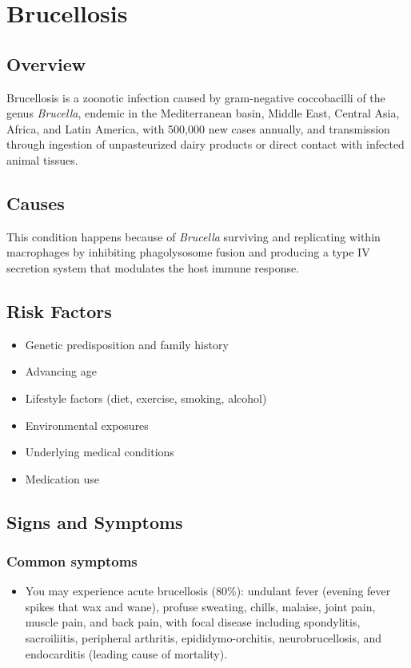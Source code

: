 \chapter{Brucellosis}
\label{sec:Brucellosis}

\section{Overview}
Brucellosis is a zoonotic infection caused by gram-negative coccobacilli of the genus \textit{Brucella}, endemic in the Mediterranean basin, Middle East, Central Asia, Africa, and Latin America, with 500,000 new cases annually, and transmission through ingestion of unpasteurized dairy products or direct contact with infected animal tissues.
\section{Causes}
This condition happens because of \textit{Brucella} surviving and replicating within macrophages by inhibiting phagolysosome fusion and producing a type IV secretion system that modulates the host immune response.     
\section{Risk Factors}

\begin{itemize}[noitemsep]
  \item Genetic predisposition and family history
  \item Advancing age
  \item Lifestyle factors (diet, exercise, smoking, alcohol)
  \item Environmental exposures
  \item Underlying medical conditions
  \item Medication use
\end{itemize}
\section{Signs and Symptoms}

\subsection{Common symptoms}
\begin{itemize}[noitemsep]
  \item You may experience acute brucellosis (80\%): undulant fever (evening fever spikes that wax and wane), profuse sweating, chills, malaise, joint pain, muscle pain, and back pain, with focal disease including spondylitis, sacroiliitis, peripheral arthritis, epididymo-orchitis, neurobrucellosis, and endocarditis (leading cause of mortality). 
  \end{itemize}

